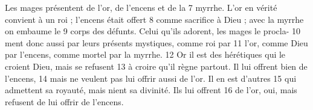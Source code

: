 Les mages présentent de l'or, de l'encens et de la	 
7	 	myrrhe. L'or en vérité convient à un roi ; l'encens était offert	 
8	 	comme sacrifice à Dieu ; avec la myrrhe on embaume le	 
9	 	corps des défunts. Celui qu'ils adorent, les mages le procla-	 
10	 	ment donc aussi par leurs présents mystiques, comme roi par	 
11	 	l'or, comme Dieu par l'encens, comme mortel par la myrrhe.	 
12	 	Or il est des hérétiques qui le croient Dieu, mais se refusent	 
13	 	à croire qu'il règne partout. Il lui offrent bien de l'encens,	 
14	 	mais ne veulent pas lui offrir aussi de l'or. Il en est d'autres	 
15	 	qui admettent sa royauté, mais nient sa divinité. Ils lui offrent	 
16	 	de l'or, oui, mais refusent de lui offrir de l'encens.